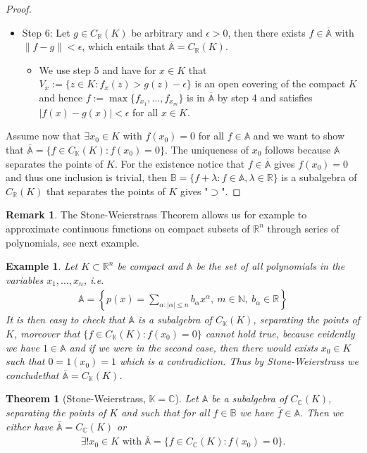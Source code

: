 \documentclass[11pt,a4paper]{article}
\newtheorem{thm}{Theorem}[section]
\newtheorem{exmp}{Example}[section]
\theoremstyle{definition}
\newtheorem{rem}{Remark}[section]
\begin{document}
\begin{proof}
\begin{itemize}
\begin{itemize}
\end{itemize}
\newpage 
\item Step 6: Let $g \in C_\mathbb{R}(K)$ be arbitrary and $\epsilon >0$, then there exists $f \in \overline{\mathbb{A}}$ with $\|f-g\| < \epsilon$, which entails that $\overline{\mathbb{A}}= C_\mathbb{R}(K)$. 
\begin{itemize}
\item We use step 5 and have for $x \in K$ that $V_x:= \{ z \in K : f_x(z) > g(z) - \epsilon \}$ is an open covering of the compact $K$ and hence $f:= \max \{ f_{x_1}, \dots , f_{x_m} \}$ is in $\overline{\mathbb{A}}$ by step 4 and satisfies $|f(x)-g(x)| < \epsilon$ for all $x \in K$. 
\end{itemize}
\end{itemize}
Assume now that  $ \exists x_0 \in K$ with $f(x_0)=0$ for all $f \in \mathbb{A}$ and we want to show that $\overline{\mathbb{A}}= \{ f \in C_\mathbb{K}(K) : f(x_0)=0 \}$. The uniqueness of $x_0$ follows because $\mathbb{A}$ separates the points of $K$. For the existence notice that $f \in \overline{\mathbb{A}}$ gives $f(x_0)=0$ and thus one inclusion is trivial, then $\mathbb{B}=\{ f + \lambda: f \in \mathbb{A}, \lambda \in \mathbb{R} \}$ is a subalgebra of $C_\mathbb{R}(K)$ that separates the points of $K$ gives "$\supset$".
\end{proof}
\begin{rem} The Stone-Weierstrass Theorem allows us for example to approximate continuous functions on compact subsets of $\mathbb{R}^n$ through series of polynomials, see next example.
\end{rem}
\begin{exmp} Let $K \subset \mathbb{R}^n$ be compact and $\mathbb{A}$ be the set of all polynomials in the variables $x_1, \dots , x_n$, i.e. 
\begin{align*}
\mathbb{A}= \left\{ p(x) = \sum_{ \alpha : | \alpha| \leq n } b_\alpha x^\alpha, \ m \in \mathbb{N}, \ b_\alpha \in \mathbb{R} \right\} 
\end{align*}
It is then easy to check that $\mathbb{A}$ is a subalgebra of $C_\mathbb{K}(K)$, separating the points of $K$, moreover that $\lbrace f \in C_\mathbb{K}(K) : f(x_0)=0 \rbrace$ cannot hold true, because evidently we have $1 \in \mathbb{A}$ and if we were in the second case, then there would exists $x_0 \in K$ such that $0=1(x_0)=1$ which is a contradiction. Thus by Stone-Weierstrass we concludethat $\overline{\mathbb{A}} = C_\mathbb{K}(K)$. 
\end{exmp}
\begin{thm}[Stone-Weierstrass, $\mathbb{K}= \mathbb{C}$] Let $\mathbb{A}$ be a subalgebra of $C_\mathbb{C}(K)$, separating the points of $K$ and such that for all $f \in \mathbb{B}$ we have $\overline{f} \in \mathbb{A}$. Then we either have $\overline{\mathbb{A}}= C_\mathbb{C}(K)$ or 
\begin{align*}
\exists ! x_0 \in K \text{ with } \overline{\mathbb{A}}= \lbrace f \in C_\mathbb{C}(K) : f(x_0)=0 \rbrace. 
\end{align*}
\end{thm}
\end{document}
